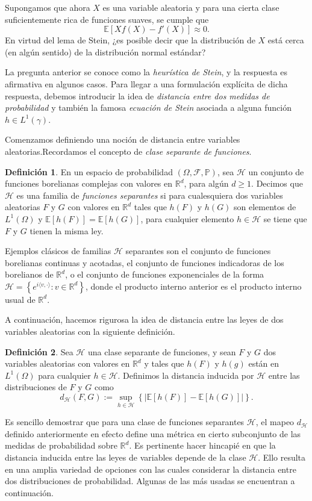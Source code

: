 \documentclass[letterpaper,twoside,12pt]{book}
\newcommand{\R}{\mathbb{R}}
\newcommand{\F}{\mathcal{F}}
\newcommand{\E}{\mathbb{E}}
\renewcommand{\P}{\mathbb{P}}
\newcommand{\1}{\mathds{1}}
\newcommand{\abs}[1]{\left\lvert #1 \right\rvert}
\theoremstyle{definition}
\newtheorem{dfn}{Definición}
\theoremstyle{definition}
\theoremstyle{remark}
\theoremstyle{definition}
\theoremstyle{definition}
\theoremstyle{definition}
\theoremstyle{definition}
\theoremstyle{definition}
\begin{document}
Supongamos que ahora $X$ es una variable aleatoria y para una cierta clase suficientemente rica de funciones suaves, se cumple que 
\[
\E\left[Xf(X)-f'(X)\right]\approx0.    
\]
En virtud del lema de Stein, ¿es posible decir que la distribución de $X$ está cerca (en algún sentido) de la distribución normal estándar?

La pregunta anterior se conoce como la \textit{heurística de Stein}, y la respuesta es afirmativa en algunos casos. Para llegar a una formulación explícita de dicha respuesta, debemos introducir la idea de \textit{distancia entre dos medidas de probabilidad} y también la famosa \textit{ecuación de Stein} asociada a alguna función $h\in L^1(\gamma)$. 

Comenzamos definiendo una noción de distancia entre variables aleatorias.Recordamos el concepto de \textit{clase separante de funciones}.

\begin{dfn} 
 En un espacio de probabilidad $(\Omega, \F, \P)$, sea $\mathscr{H}$ un conjunto de funciones borelianas complejas con valores en $\R^d$, para algún $d\geq1$. Decimos que $\mathscr{H}$ es una familia de \textit{funciones separantes} si para cualesquiera dos variables aleatorias $F$ y $G$ con valores en $\R^{d}$ tales que $h(F)$ y $h(G)$ son elementos de $L^1(\Omega)$ y $\E\left[h(F)\right]=\E\left[h(G)\right]$, para cualquier elemento $h\in \mathscr{H}$ se tiene que $F$ y $G$ tienen la misma ley.
 \end{dfn}
Ejemplos clásicos de familias $\mathscr{H}$ separantes son el conjunto de funciones borelianas continuas y acotadas, el conjunto de funciones indicadoras de los borelianos de $\R^{d}$, o el conjunto de funciones exponenciales de la forma $\mathscr{H}=\left\{e^{i \langle v,\cdot\rangle}: v\in \R^{d} \right\}$, donde el producto interno anterior es el producto interno usual de $\R^{d}$.

A continuación, hacemos rigurosa la idea de distancia entre las leyes de dos variables aleatorias con la siguiente definición.
\begin{dfn} 
 Sea $\mathscr{H}$ una clase separante de funciones, y sean $F$ y $G$ dos variables aleatorias con valores en $\R^{d}$ y tales que $h(F)$ y $h(g)$ están en $L^1(\Omega)$ para cualquier $h\in \mathscr{H}$. Definimos la distancia inducida por $\mathscr{H}$ entre las distribuciones de $F$ y $G$ como 
 \[
 d_\mathscr{H}(F,G):=\sup_{h\in \mathscr{H}}\left\{\abs{\E\left[h(F)\right]-\E\left[h(G)\right]}\right\}.
 \]
 \end{dfn}
Es sencillo demostrar que para una clase de funciones separantes $\mathscr{H}$, el mapeo $d_\mathscr{H}$ definido anteriormente en efecto define una métrica en cierto subconjunto de las medidas de probabilidad sobre $\R^{d}$. Es pertinente hacer hincapié en que la distancia inducida entre las leyes de variables depende de la clase $\mathscr{H}$. Ello resulta en una amplia variedad de opciones con las cuales considerar la distancia entre dos distribuciones de probabilidad. Algunas de las más usadas se encuentran a continuación.
\end{document}
